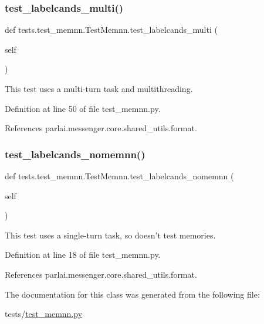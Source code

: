 \subsubsection{\texorpdfstring{test\+\_\+labelcands\+\_\+multi()}{test\_labelcands\_multi()}}
{\footnotesize\ttfamily def tests.\+test\+\_\+memnn.\+Test\+Memnn.\+test\+\_\+labelcands\+\_\+multi (\begin{DoxyParamCaption}\item[{}]{self }\end{DoxyParamCaption})}

\begin{DoxyVerb}This test uses a multi-turn task and multithreading.\end{DoxyVerb}
 

Definition at line 50 of file test\+\_\+memnn.\+py.



References parlai.\+messenger.\+core.\+shared\+\_\+utils.\+format.

\mbox{\label{classtests_1_1test__memnn_1_1TestMemnn_a3e3c10325fc7905dc77b8e1b1db4490a}} 
\subsubsection{\texorpdfstring{test\+\_\+labelcands\+\_\+nomemnn()}{test\_labelcands\_nomemnn()}}
{\footnotesize\ttfamily def tests.\+test\+\_\+memnn.\+Test\+Memnn.\+test\+\_\+labelcands\+\_\+nomemnn (\begin{DoxyParamCaption}\item[{}]{self }\end{DoxyParamCaption})}

\begin{DoxyVerb}This test uses a single-turn task, so doesn't test memories.\end{DoxyVerb}
 

Definition at line 18 of file test\+\_\+memnn.\+py.



References parlai.\+messenger.\+core.\+shared\+\_\+utils.\+format.



The documentation for this class was generated from the following file\+:\begin{DoxyCompactItemize}
\item 
tests/\hyperlink{test__memnn_8py}{test\+\_\+memnn.\+py}\end{DoxyCompactItemize}
